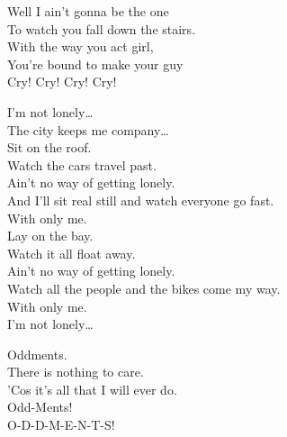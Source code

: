 Well I ain't gonna be the one \\
To watch you fall down the stairs. \\
With the way you act girl, \\
You're bound to make your guy \\
Cry! Cry! Cry! Cry! \\









I'm not lonely… \\
The city keeps me company… \\

Sit on the roof. \\
Watch the cars travel past. \\
Ain't no way of getting lonely. \\
And I'll sit real still and watch everyone go fast. \\
With only me. \\

Lay on the bay. \\
Watch it all float away. \\
Ain't no way of getting lonely. \\
Watch all the people and the bikes come my way. \\
With only me. \\

I'm not lonely… \\





Oddments. \\
There is nothing to care. \\
'Cos it's all that I will ever do. \\
Odd-Ments! \\

O-D-D-M-E-N-T-S! \\
